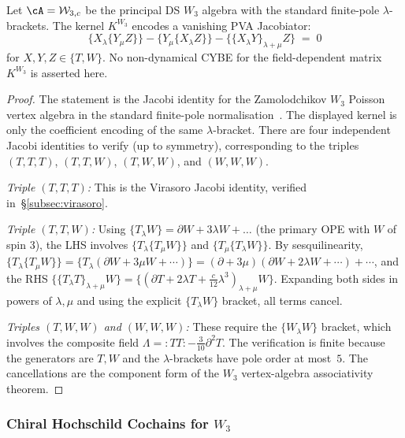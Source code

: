 \begin{theorem}
\label{thm:w3-CYBE}
Let\/ $\cA=\mathcal W_{3,c}$ be the principal DS $W_3$ algebra with
the standard finite-pole $\lambda$-brackets.
The kernel $K^{W_3}$ encodes a vanishing PVA Jacobiator:
\begin{equation}
\{X_\lambda \{Y_\mu Z\}\}
- \{Y_\mu \{X_\lambda Z\}\}
- \{\{X_\lambda Y\}_{\lambda+\mu} Z\}
\;=\;0
\end{equation}
for $X,Y,Z\in\{T,W\}$. No non-dynamical CYBE for the
field-dependent matrix $K^{W_3}$ is asserted here.
\end{theorem}

\begin{proof}
The statement is the Jacobi identity for the Zamolodchikov
$W_3$ Poisson vertex algebra in the standard finite-pole
normalisation~\cite{BouFeiMal90}. The displayed kernel is only the
coefficient encoding of the same $\lambda$-bracket.
There are four independent Jacobi identities to verify (up to symmetry), corresponding to the triples $(T,T,T)$, $(T,T,W)$, $(T,W,W)$, and $(W,W,W)$.

\emph{Triple $(T,T,T)$:} This is the Virasoro Jacobi identity, verified in~\S\ref{subsec:virasoro}.

\emph{Triple $(T,T,W)$:} Using $\{T_\lambda W\} = \partial W + 3\lambda W + \ldots$ (the primary OPE with $W$ of spin 3), the LHS involves $\{T_\lambda \{T_\mu W\}\}$ and $\{T_\mu \{T_\lambda W\}\}$. By sesquilinearity, $\{T_\lambda \{T_\mu W\}\} = \{T_\lambda (\partial W + 3\mu W + \cdots)\} = (\partial + 3\mu)(\partial W + 2\lambda W + \cdots) + \cdots$, and the RHS $\{\{T_\lambda T\}_{\lambda+\mu} W\} = \{(\partial T + 2\lambda T + \frac{c}{12}\lambda^3)_{\lambda+\mu} W\}$. Expanding both sides in powers of $\lambda, \mu$ and using the explicit $\{T_\lambda W\}$ bracket, all terms cancel.

\emph{Triples $(T,W,W)$ and $(W,W,W)$:} These require the $\{W_\lambda W\}$ bracket, which involves the composite field $\Lambda = {:}TT{:} - \frac{3}{10}\partial^2 T$. The verification is finite because the generators are $T,W$ and the $\lambda$-brackets have pole order at most~$5$. The cancellations are the component form of the $W_3$ vertex-algebra associativity theorem.
\end{proof}

\subsubsection{Chiral Hochschild Cochains for $W_3$}

